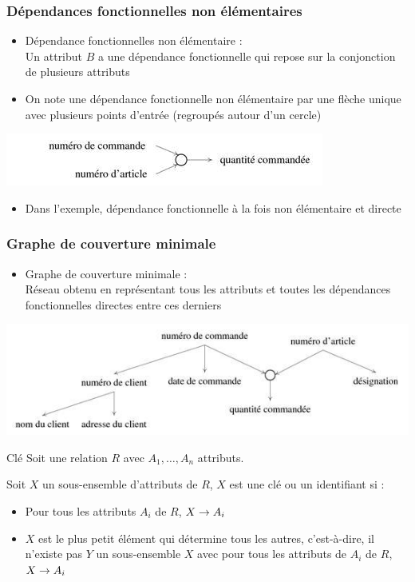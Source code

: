 \begin{frame}
  \frametitle{Dépendances fonctionnelles non élémentaires}
  \begin{itemize}
    \item Dépendance fonctionnelles non élémentaire :\\
      Un attribut $B$ a une dépendance fonctionnelle qui repose sur la conjonction de plusieurs
      attributs
    \item On note une dépendance fonctionnelle non élémentaire par une flèche unique avec plusieurs points
      d'entrée (regroupés autour d'un cercle)
  \end{itemize}
  \begin{center}
    \includegraphics[width=0.9\linewidth]{dependance_fonctionnelle_non_elementaire.jpg}
  \end{center}
  \begin{itemize}
  \item Dans l'exemple, dépendance fonctionnelle à la fois non élémentaire et directe
  \end{itemize}
\end{frame}

\begin{frame}
  \frametitle{Graphe de couverture minimale}
  \begin{itemize}
    \item Graphe de couverture minimale :\\
      Réseau obtenu en représentant tous les attributs et toutes les dépendances fonctionnelles directes entre
      ces derniers
  \end{itemize}
  \begin{center}
    \includegraphics[width=0.9\linewidth]{graphe_couverture_minimale.jpg}
  \end{center}
\end{frame}

\begin{framentitle}{Clé}
    Soit une relation $R$ avec ${A_1, \dots, A_n}$ attributs.

    Soit $X$ un sous-ensemble d'attributs de $R$, $X$ est une clé ou un
    identifiant si :
    \begin{itemize}
        \item Pour tous les attributs $A_i$ de $R$, $X \rightarrow A_i$
        \item $X$ est le plus petit élément qui détermine tous les autres,
            c'est-à-dire, il n'existe pas $Y$ un sous-ensemble $X$ avec pour
            tous les attributs de $A_i$ de $R$, $X \rightarrow A_i$
    \end{itemize}
\end{framentitle}

